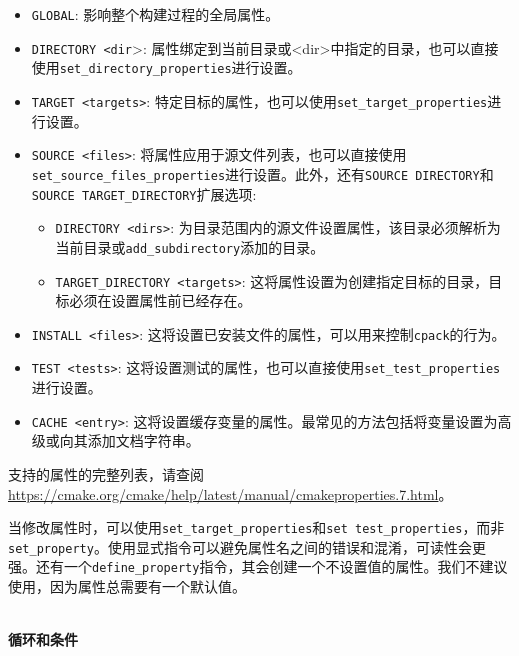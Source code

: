 \begin{itemize}
\item 
\texttt{GLOBAL}: 影响整个构建过程的全局属性。

\item 
\texttt{DIRECTORY <dir}>: 属性绑定到当前目录或<dir>中指定的目录，也可以直接使用\texttt{set\_directory\_properties}进行设置。

\item 
\texttt{TARGET <targets>}: 特定目标的属性，也可以使用\texttt{set\_target\_properties}进行设置。

\item 
\texttt{SOURCE <files>}: 将属性应用于源文件列表，也可以直接使用\texttt{set\_source\_files\_properties}进行设置。此外，还有\texttt{SOURCE DIRECTORY}和\texttt{SOURCE TARGET\_DIRECTORY}扩展选项:

\begin{itemize}
\item 
\texttt{DIRECTORY <dirs>}: 为目录范围内的源文件设置属性，该目录必须解析为当前目录或\texttt{add\_subdirectory}添加的目录。

\item 
\texttt{TARGET\_DIRECTORY <targets>}: 这将属性设置为创建指定目标的目录，目标必须在设置属性前已经存在。
\end{itemize}

\item 
\texttt{INSTALL <files>}: 这将设置已安装文件的属性，可以用来控制\texttt{cpack}的行为。

\item 
\texttt{TEST <tests>}: 这将设置测试的属性，也可以直接使用\texttt{set\_test\_properties}进行设置。

\item 
\texttt{CACHE <entry>}: 这将设置缓存变量的属性。最常见的方法包括将变量设置为高级或向其添加文档字符串。
\end{itemize}

支持的属性的完整列表，请查阅\url{https://cmake.org/cmake/help/latest/manual/cmakeproperties.7.html}。

当修改属性时，可以使用\texttt{set\_target\_properties}和\texttt{set\ test\_properties}，而非\texttt{set\_property}。使用显式指令可以避免属性名之间的错误和混淆，可读性会更强。还有一个\texttt{define\_property}指令，其会创建一个不设置值的属性。我们不建议使用，因为属性总需要有一个默认值。

\hspace*{\fill} \\ %
\noindent
\textbf{循环和条件}

